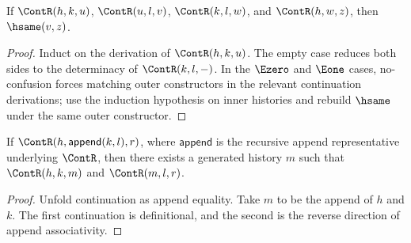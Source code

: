 \begin{theorem}
\label{thm:continuation-associativity}
\label{thm:continuation-associativity-up-to-hsame}
\label{thm:continuation-associativity-spine}
\label{thm:continuation-associativity-up-to-hsame-spine}
If \(\ContR(h,k,u)\), \(\ContR(u,l,v)\), \(\ContR(k,l,w)\), and \(\ContR(h,w,z)\), then \(\hsame(v,z)\).
\end{theorem}
\begin{proof}
Induct on the derivation of \(\ContR(h,k,u)\). The empty case reduces both sides to the determinacy of \(\ContR(k,l,-)\). In the \(\Ezero\) and \(\Eone\) cases, no-confusion forces matching outer constructors in the relevant continuation derivations; use the induction hypothesis on inner histories and rebuild \(\hsame\) under the same outer constructor.
\end{proof}

\begin{theorem}
\label{thm:cont-right-append-decompose}
If $\ContR(h,\mathsf{append}(k,l),r)$, where $\mathsf{append}$ is the recursive append representative underlying $\ContR$, then there exists a generated history $m$ such that $\ContR(h,k,m)$ and $\ContR(m,l,r)$.
\end{theorem}
\begin{proof}
Unfold continuation as append equality. Take \(m\) to be the append of \(h\) and \(k\). The first continuation is definitional, and the second is the reverse direction of append associativity.
\end{proof}

